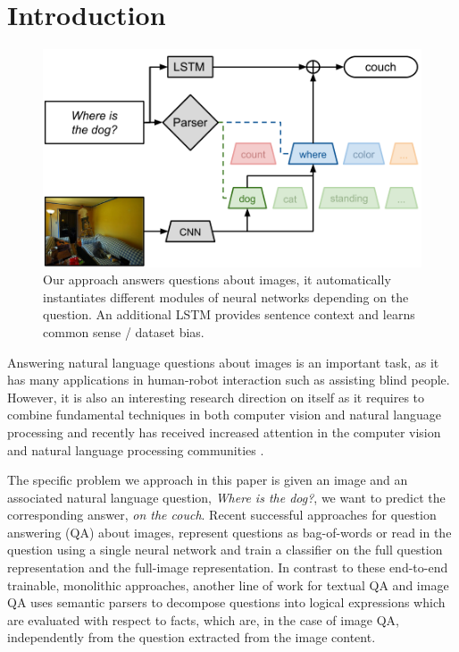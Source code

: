 \section{Introduction}
\begin{figure}[t]
\begin{center}
\includegraphics[width=\linewidth]{fig/teaser}
\end{center}
   \caption{Our approach answers questions about images, it automatically instantiates different modules of neural networks depending on the question. An additional LSTM provides sentence context and learns common sense / dataset bias.}
\label{fig:teaser}
\end{figure}
Answering natural language questions about images is an important task, as it has many applications in human-robot interaction such as assisting blind people. However, it is also an interesting research direction on itself as it requires to combine fundamental techniques in both computer vision and natural language processing and recently has received increased attention in the computer vision and natural language processing communities \cite{antol15iccv,gao2015you,ma15arxiv,malinowski15iccv,ren2015image,yu15arxiv}.

The specific problem we approach in this paper is given an image and an associated natural language question, \eg \emph{Where is the dog?}, we want to predict the corresponding answer, \eg \emph{on the couch}. 
Recent successful approaches for question answering (QA) about images, represent questions as bag-of-words \cite{} or read in the question using a single neural network \cite{malinowski15iccv}\cite{} and train a classifier on the full question representation and the full-image representation. In contrast to these end-to-end trainable, monolithic approaches, another line of work for textual QA \cite{Liang13DCS} and image QA\cite{malinowski14nips} uses semantic parsers to decompose questions into logical expressions which are evaluated with respect to facts, which are, in the case of image QA, independently from the question extracted from the image content.

